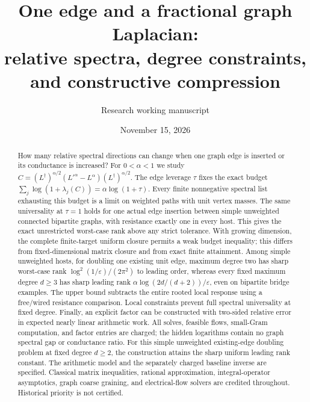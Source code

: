 \documentclass[11pt]{article}
\title{One edge and a fractional graph Laplacian:\\
relative spectra, degree constraints, and constructive compression}
\author{Research working manuscript}
\date{November 15, 2026}
\begin{document}
\maketitle
\begin{abstract}
How many relative spectral directions can change when one graph edge is
inserted or its conductance is increased? For $0<\alpha<1$ we study
$C=(L^\dagger)^{\alpha/2}(L'^\alpha-L^\alpha)(L^\dagger)^{\alpha/2}$.
The edge leverage $\tau$ fixes the exact budget
$\sum_j\log(1+\lambda_j(C))=\alpha\log(1+\tau)$.
Every finite nonnegative spectral list exhausting this budget is a limit
on weighted paths with unit vertex masses. The same universality at
$\tau=1$ holds for one actual edge insertion between simple unweighted
connected bipartite graphs, with resistance exactly one in every host.
This gives the exact unrestricted worst-case rank above any strict
tolerance. With growing dimension, the complete finite-target uniform
closure permits a weak budget inequality; this differs from fixed-dimensional
matrix closure and from exact finite attainment.
Among simple unweighted hosts, for doubling one existing unit edge,
maximum degree two has sharp worst-case rank
$\log^2(1/\varepsilon)/(2\pi^2)$ to leading order, whereas every fixed
maximum degree $d\ge3$ has sharp leading rank
$\alpha\log(2d/(d+2))/\varepsilon$, even on bipartite bridge examples.
The upper bound subtracts the entire rooted local response using a
free/wired resistance comparison. Local constraints prevent full
spectral universality at fixed degree.
Finally, an explicit factor can be constructed with two-sided relative
error in expected nearly linear arithmetic work. All solves, feasible
flows, small-Gram computation, and factor entries are charged; the
hidden logarithms contain no graph spectral gap or conductance ratio.
For this simple unweighted existing-edge doubling problem at fixed
degree $d\ge2$, the construction attains the sharp uniform leading
rank constant. The arithmetic model and the separately charged
baseline inverse are specified. Classical matrix inequalities, rational approximation,
integral-operator asymptotics, graph coarse graining, and electrical-flow
solvers are credited throughout. Historical priority is not certified.
\end{abstract}
\end{document}
